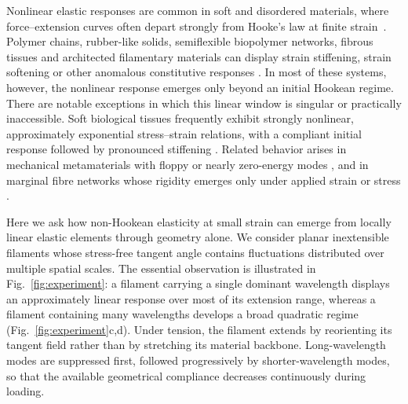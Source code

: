 \documentclass[pdflatex, twocolumn, sn-nature]{sn-jnl}
\begin{document}
Nonlinear elastic responses are common in soft and disordered
materials, where force--extension curves often depart strongly from
Hooke's law at finite strain~\cite{Storm2005,Onck2005,
BroederszMacKintosh2014,Kang2009}. Polymer chains, rubber-like solids,
semiflexible biopolymer networks, fibrous tissues and architected
filamentary materials can display strain stiffening, strain softening
or other anomalous constitutive responses
\cite{Bustamante2003,deGennesScaling,RubinsteinColby,MarkoSiggia1995,
MacKintosh1995,Head2003,Sheinman2012,Bertoldi2017}.
In most of these systems, however, the nonlinear response emerges
only beyond an initial Hookean regime. There are notable
exceptions in which this linear window is singular or practically
inaccessible. Soft biological tissues frequently exhibit strongly
nonlinear, approximately exponential stress--strain relations, with
a compliant initial response followed by pronounced stiffening
\cite{fung1967elasticity}. Related behavior arises in mechanical metamaterials
with floppy or nearly zero-energy modes \cite{Bertoldi2017}, and in
marginal fibre networks whose rigidity emerges only under applied
strain or stress \cite{Broedersz2011,Sheinman2012,Sharma2016}. 


Here we ask how non-Hookean elasticity at small strain can emerge from locally linear elastic elements through geometry alone. 
We consider planar inextensible filaments whose stress-free tangent angle contains fluctuations distributed over multiple spatial scales. 
The essential observation is illustrated in Fig.~\ref{fig:experiment}: 
a filament carrying a single dominant wavelength displays an approximately linear response over most of its extension range, whereas a filament containing many wavelengths develops a broad quadratic regime (Fig.~\ref{fig:experiment}c,d). 
Under tension, the filament extends by reorienting its tangent field rather than by stretching its material backbone. Long-wavelength modes are suppressed first, followed progressively by shorter-wavelength modes, so that the available geometrical compliance decreases continuously during loading.
\end{document}
